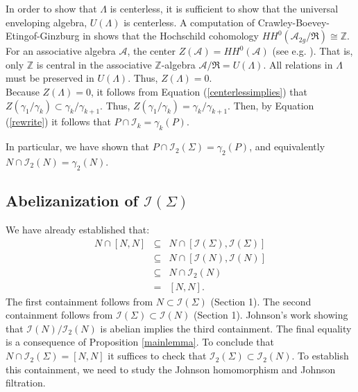 \documentclass[a4paper]{amsproc}
\theoremstyle{TheoremNum}
\theoremstyle{Theorembold}
\theoremstyle{TheoremboldDef}
\theoremstyle{TheoremboldRem}
\theoremstyle{TheoremboldRem}
\begin{document}
 In order to show that $\Lambda$ is centerless, it is sufficient to show that the universal enveloping algebra, $U(\Lambda)$ is centerless.
A computation of Crawley-Boevey-Etingof-Ginzburg in  \cite[Thm.8.4.1(ii)]{ginzburg} shows that the Hochschild cohomology $HH^{0}(\mathcal{A}_{2g}/\mathfrak{R})\cong{\mathbb{Z}}$. For an associative algebra $\mathcal{A}$, the center $Z(\mathcal{A})=HH^{0}(\mathcal{A})$ (see e.g. \cite[Sect.9.1.1]{weibel}). That is, only ${\mathbb{Z}}$ is central in the associative ${\mathbb{Z}}$-algebra $\mathcal{A}/\mathfrak{R}=U(\Lambda)$. All relations in $\Lambda$ must be preserved in $U(\Lambda)$. Thus, $Z(\Lambda)=0$.\\

Because $Z(\Lambda)=0$, it follows from Equation (\ref{centerlessimplies}) that  $Z(\gamma_1/\gamma_k)\subset\gamma_k/\gamma_{k+1}$. Thus, $Z(\gamma_1/\gamma_k)=\gamma_k/\gamma_{k+1}$. Then, by Equation (\ref{rewrite}) it follows that $P\cap{\mathcal{I}}_k=\gamma_k(P).$

In particular, we have shown that $P\cap{{\mathcal{I}}_2(\Sigma)}=\gamma_2(P)$, and equivalently $N\cap{{\mathcal{I}}_2(N)}=\gamma_2(N)$.

\subsection{Abelizanization of ${{\mathcal{I}}(\Sigma)}$}
We have already established that: \begin{eqnarray*}N\cap[N,N]&\subseteq& N\cap[{{\mathcal{I}}(\Sigma)},{{\mathcal{I}}(\Sigma)}]\\ &\subseteq& N\cap[{{\mathcal{I}}(N)},{{\mathcal{I}}(N)}]\\ &\subseteq& N\cap{{\mathcal{I}}_2(N)}\\&=&[N,N].\end{eqnarray*} The first containment follows from $N\subset{{\mathcal{I}}(\Sigma)}$ (Section 1). The second containment follows from ${{\mathcal{I}}(\Sigma)}\subset{{\mathcal{I}}(N)}$ (Section 1). Johnson's work showing that ${{\mathcal{I}}(N)}/{{\mathcal{I}}_2(N)}$ is abelian implies the third containment. The final equality is a consequence of Proposition \ref{mainlemma}. To conclude that $N\cap{{\mathcal{I}}_2(\Sigma)}=[N,N]$ it suffices to check that ${{\mathcal{I}}_2(\Sigma)}\subset{{\mathcal{I}}_2(N)}$. To establish this containment, we need to study the Johnson homomorphism and Johnson filtration. \\
\end{document}
